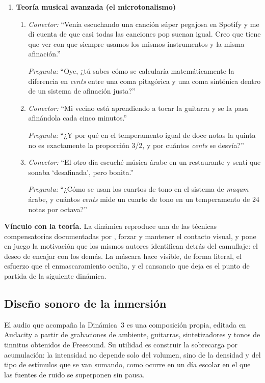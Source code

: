 \begin{enumerate}[label=\textbf{Tema \arabic*.}, wide=0pt, leftmargin=0pt, itemsep=0.6em]
  \item \textbf{Teoría musical avanzada (el microtonalismo)}
  \begin{enumerate}[label=\alph*), leftmargin=1.8em, itemsep=0.3em]
    \item \textit{Conector:} \enquote{Venía escuchando una canción súper pegajosa en Spotify y me di cuenta de que casi todas las canciones pop suenan igual. Creo que tiene que ver con que siempre usamos los mismos instrumentos y la misma afinación.}\par
    \textit{Pregunta:} \enquote{Oye, ¿tú sabes cómo se calcularía matemáticamente la diferencia en \textit{cents} entre una coma pitagórica y una coma sintónica dentro de un sistema de afinación justa?}
    \item \textit{Conector:} \enquote{Mi vecino está aprendiendo a tocar la guitarra y se la pasa afinándola cada cinco minutos.}\par
    \textit{Pregunta:} \enquote{¿Y por qué en el temperamento igual de doce notas la quinta no es exactamente la proporción 3/2, y por cuántos \textit{cents} se desvía?}
    \item \textit{Conector:} \enquote{El otro día escuché música árabe en un restaurante y sentí que sonaba \enquote{desafinada}, pero bonita.}\par
    \textit{Pregunta:} \enquote{¿Cómo se usan los cuartos de tono en el sistema de \textit{maqam} árabe, y cuántos \textit{cents} mide un cuarto de tono en un temperamento de 24 notas por octava?}
  \end{enumerate}

\end{enumerate}

\textbf{Vínculo con la teoría.} La dinámica reproduce una de las técnicas compensatorias documentadas por \citet{hull2017}, forzar y mantener el contacto visual, y pone en juego la motivación que los mismos autores identifican detrás del camuflaje: el deseo de encajar con los demás. La máscara hace visible, de forma literal, el esfuerzo que el enmascaramiento oculta, y el cansancio que deja es el punto de partida de la siguiente dinámica.

\subsection{Diseño sonoro de la inmersión}
\label{sec:audio}

El audio que acompaña la Dinámica~3 es una composición propia, editada en Audacity a partir de grabaciones de ambiente, guitarras, sintetizadores y tonos de tinnitus obtenidos de Freesound. Su utilidad es construir la sobrecarga por acumulación: la intensidad no depende solo del volumen, sino de la densidad y del tipo de estímulos que se van sumando, como ocurre en un día escolar en el que las fuentes de ruido se superponen sin pausa.

